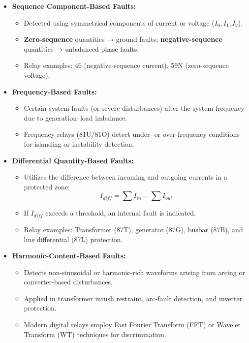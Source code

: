 \begin{itemize}
\item \textbf{Sequence Component-Based Faults:}
\begin{itemize}
\item Detected using symmetrical components of current or voltage (\(I_0, I_1, I_2\)).
\item \textbf{Zero-sequence} quantities → ground faults; \textbf{negative-sequence} quantities → unbalanced phase faults.
\item Relay examples: 46 (negative-sequence current), 59N (zero-sequence voltage).
\end{itemize}

\item \textbf{Frequency-Based Faults:}
\begin{itemize}
\item Certain system faults (or severe disturbances) alter the system frequency due to generation–load imbalance.
\item Frequency relays (81U/81O) detect under- or over-frequency conditions for islanding or instability detection.
\end{itemize}

\item \textbf{Differential Quantity-Based Faults:}
\begin{itemize}
\item Utilizes the difference between incoming and outgoing currents in a protected zone:
\[
I_{diff} = \sum I_{in} - \sum I_{out}
\]
\item If \(I_{diff}\) exceeds a threshold, an internal fault is indicated.
\item Relay examples: Transformer (87T), generator (87G), busbar (87B), and line differential (87L) protection.
\end{itemize}

\item \textbf{Harmonic-Content-Based Faults:}
\begin{itemize}
\item Detects non-sinusoidal or harmonic-rich waveforms arising from arcing or converter-based disturbances.
\item Applied in transformer inrush restraint, arc-fault detection, and inverter protection.
\item Modern digital relays employ Fast Fourier Transform (FFT) or Wavelet Transform (WT) techniques for discrimination.
\end{itemize}
\end{itemize}

